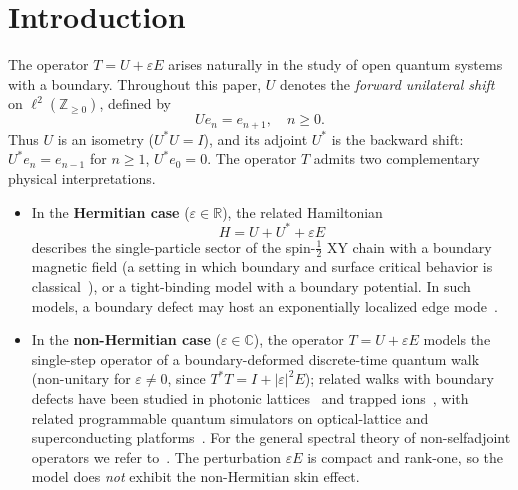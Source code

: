\documentclass[10pt]{amsart}
\newcommand{\1}{{\mathbb{I}}}
\numberwithin{equation}{section}
\begin{document}
\maketitle
\tableofcontents

\section{Introduction}
\label{sec:introduction}

The operator $T = U + \varepsilon E$ arises naturally in the study of open quantum systems
with a boundary. Throughout this paper, $U$ denotes the \emph{forward unilateral shift} on
$\ell^2(\mathbb{Z}_{\ge 0})$, defined by
\begin{equation}\label{eq:forward-shift}
U e_n = e_{n+1}, \quad n \ge 0.
\end{equation}
Thus $U$ is an isometry ($U^*U = I$), and its adjoint $U^*$ is the backward shift:
$U^* e_n = e_{n-1}$ for $n \ge 1$, $U^* e_0 = 0$. The operator $T$ admits two complementary
physical interpretations.

\begin{itemize}
\item In the \textbf{Hermitian case} ($\varepsilon \in \mathbb{R}$), the related Hamiltonian
\begin{equation}\label{eq:spin-chain}
H = U + U^* + \varepsilon E
\end{equation}
describes the single-particle sector of the spin-$\tfrac{1}{2}$ XY chain with a boundary
magnetic field (a setting in which boundary and surface critical behavior is classical~\cite{Cardy84}),
or a tight-binding model with a boundary potential. In such models, a boundary
defect may host an exponentially localized edge mode~\cite{Hats93, SSH79}.

\item In the \textbf{non-Hermitian case} ($\varepsilon \in \mathbb{C}$), the operator
$T = U + \varepsilon E$ models the single-step operator of a boundary-deformed discrete-time
quantum walk (non-unitary for $\varepsilon\ne0$, since $T^*T = I + |\varepsilon|^2 E$); related
walks with boundary defects have been studied in photonic
lattices~\cite{Kitagawa12} and trapped ions~\cite{Xue15}, with related programmable quantum
simulators on optical-lattice and superconducting platforms~\cite{Kaufman_2016, Mi_2023}. For
the general spectral theory of non-selfadjoint operators we refer to~\cite{GK69}. The
perturbation $\varepsilon E$
is compact and rank-one, so the model does \emph{not} exhibit the non-Hermitian skin effect.
\end{itemize}
\end{document}
